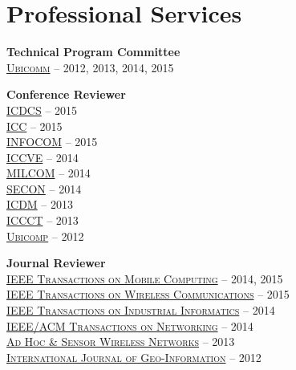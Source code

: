 \section{\sc Professional Services}
{\bf Technical Program Committee}\\
{\href{http://www.iaria.org/conferences.html}{\textsc{Ubicomm}}} -- 2012, 2013, 2014, 2015

{\bf Conference Reviewer}\\
{\href{http://icdcs-2015.cse.ohio-state.edu/}{\textsc{ICDCS}}} -- 2015\\
{\href{http://icc2015.ieee-icc.org/}{\textsc{ICC}}} -- 2015\\
{\href{http://infocom2015.ieee-infocom.org/}{\textsc{INFOCOM}}} -- 2015\\
{\href{http://www.iccve.org/2014/}{\textsc{ICCVE}}} -- 2014\\
{\href{http://www.milcom.org/2014/}{\textsc{MILCOM}}} -- 2014\\
{\href{http://secon2014.ieee-secon.org}{\textsc{SECON}}} -- 2014\\
{\href{http://icdm2013.rutgers.edu}{\textsc{ICDM}}} -- 2013\\
{\href{http://www.mnnit.ac.in/iccct2013}{\textsc{ICCCT}}} -- 2013\\
{\href{http://www.ubicomp.org/ubicomp2012}{\textsc{Ubicomp}}} -- 2012

{\bf Journal Reviewer}\\
{\href{http://www.computer.org/portal/web/tmc}{\textsc{IEEE Transactions on Mobile Computing}}} -- 2014, 2015\\
{\href{http://www.comsoc.org/twc}{\textsc{IEEE Transactions on Wireless Communications}}} -- 2015\\
{\href{http://tii.ieee-ies.org}{\textsc{IEEE Transactions on Industrial Informatics}}} -- 2014\\
{\href{http://www.ifp.illinois.edu/ton}{\textsc{IEEE/ACM Transactions on Networking}}} -- 2014\\
{\href{http://www.oldcitypublishing.com/AHSWN/AHSWN.html}{\textsc{Ad Hoc \& Sensor Wireless Networks}}} -- 2013\\
{\href{http://www.mdpi.com/journal/ijgi}{\textsc{International Journal of Geo-Information}}} -- 2012
